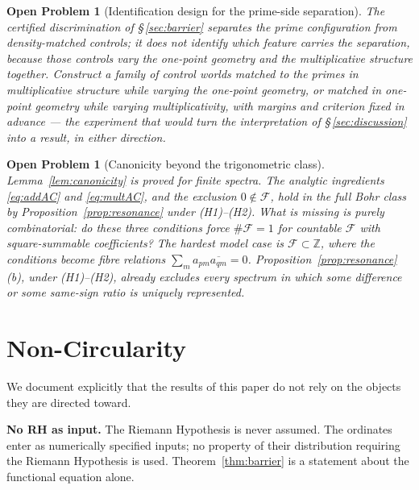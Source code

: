 \documentclass[11pt]{article}
\newtheorem{openproblem}[theorem]{Open Problem}
\begin{document}
\begin{openproblem}[Identification design for the prime-side separation]
\label{op:ident}
The certified discrimination of \S\,\ref{sec:barrier} separates the prime
configuration from density-matched controls; it does not identify which
feature carries the separation, because those controls vary the one-point
geometry and the multiplicative structure together. Construct a family of
control worlds matched to the primes in multiplicative structure while varying
the one-point geometry, or matched in one-point geometry while varying
multiplicativity, with margins and criterion fixed in advance --- the
experiment that would turn the interpretation of
\S\,\ref{sec:discussion} into a result, in either direction.
\end{openproblem}

\begin{openproblem}[Canonicity beyond the trigonometric class]
\label{op:canon}
Lemma~\ref{lem:canonicity} is proved for finite spectra. The analytic
ingredients \eqref{eq:addAC} and \eqref{eq:multAC}, and the exclusion
$0\notin\mathcal{F}$, hold in the full Bohr class by
Proposition~\ref{prop:resonance} under (H1)--(H2). What is missing is purely combinatorial: do
these three conditions force $\#\mathcal{F}=1$ for countable $\mathcal{F}$
with square-summable coefficients? The hardest model case is
$\mathcal{F}\subset\mathbb{Z}$, where the conditions become fibre relations
$\sum_m a_{pm}\overline{a_{qm}}=0$. Proposition~\ref{prop:resonance}(b),
under (H1)--(H2), already excludes every spectrum in which some difference or
some same-sign ratio is uniquely represented.
\end{openproblem}

\section*{Non-Circularity}
\label{sec:nocirc}

We document explicitly that the results of this paper do not rely on the
objects they are directed toward.

\textbf{No RH as input.}
The Riemann Hypothesis is never assumed. The ordinates enter as numerically
specified inputs; no property of their distribution requiring the Riemann
Hypothesis is used. Theorem~\ref{thm:barrier} is a statement about the
functional equation alone.
\end{document}

